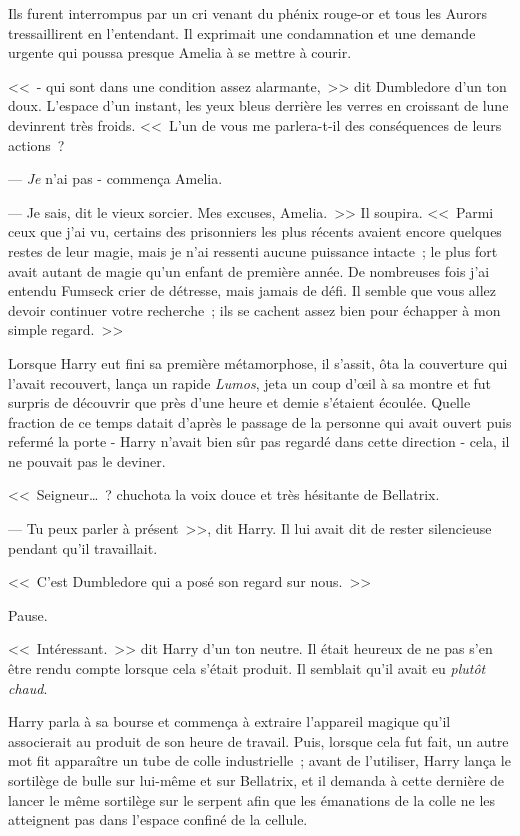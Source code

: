 Ils furent interrompus par un cri venant du phénix rouge-or et tous les Aurors tressaillirent en l'entendant. Il exprimait une condamnation et une demande urgente qui poussa presque Amelia à se mettre à courir.

<<~- qui sont dans une condition assez alarmante,~>> dit Dumbledore d'un ton doux. L'espace d'un instant, les yeux bleus derrière les verres en croissant de lune devinrent très froids. <<~L'un de vous me parlera-t-il des conséquences de leurs actions~?

--- \emph{Je} n'ai pas -  commença Amelia.

--- Je sais, dit le vieux sorcier. Mes excuses, Amelia.~>> Il soupira. <<~Parmi ceux que j'ai vu, certains des prisonniers les plus récents avaient encore quelques restes de leur magie, mais je n'ai ressenti aucune puissance intacte~; le plus fort avait autant de magie qu'un enfant de première année. De nombreuses fois j'ai entendu Fumseck crier de détresse, mais jamais de défi. Il semble que vous allez devoir continuer votre recherche~; ils se cachent assez bien pour échapper à mon simple regard.~>>

\later

Lorsque Harry eut fini sa première métamorphose, il s'assit, ôta la couverture qui l'avait recouvert, lança un rapide \emph{Lumos}, jeta un coup d'œil à sa montre et fut surpris de découvrir que près d'une heure et demie s'étaient écoulée. Quelle fraction de ce temps datait d'après le passage de la personne qui avait ouvert puis refermé la porte - Harry n'avait bien sûr pas regardé dans cette direction - cela, il ne pouvait pas le deviner.

<<~Seigneur…~? chuchota la voix douce et très hésitante de Bellatrix.

--- Tu peux parler à présent~>>, dit Harry. Il lui avait dit de rester silencieuse pendant qu'il travaillait.

<<~C'est Dumbledore qui a posé son regard sur nous.~>>

Pause.

<<~Intéressant.~>> dit Harry d'un ton neutre. Il était heureux de ne pas s'en être rendu compte lorsque cela s'était produit. Il semblait qu'il avait eu \emph{plutôt chaud}.

Harry parla à sa bourse et commença à extraire l'appareil magique qu'il associerait au produit de son heure de travail. Puis, lorsque cela fut fait, un autre mot fit apparaître un tube de colle industrielle~; avant de l'utiliser, Harry lança le sortilège de bulle sur lui-même et sur Bellatrix, et il demanda à cette dernière de lancer le même sortilège sur le serpent afin que les émanations de la colle ne les atteignent pas dans l'espace confiné de la cellule.

